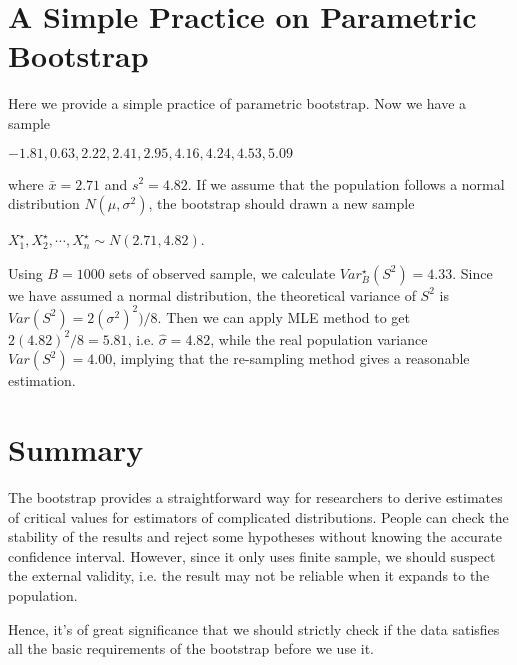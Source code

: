 \documentclass{journal}
\begin{document}
\section{A Simple Practice on Parametric Bootstrap}
\par Here we provide a simple practice of parametric bootstrap. Now we have a sample
\begin{center}
$ -1.81, 0.63, 2.22, 2.41, 2.95, 4.16, 4.24, 4.53, 5.09 $
\end{center}
where $ \bar{x}=2.71 $ and $ s^2=4.82 $. If we assume that the population follows a normal distribution $ N(\mu,\sigma^2) $, the bootstrap should drawn a new sample
\begin{center}
$ X_1^\star, X_2^\star, \cdots, X_n^\star \sim N(2.71, 4.82) $.
\end{center}
\par Using $B=1000$ sets of observed sample, we calculate $ Var_B^\star(S^2)=4.33 $. Since we have assumed a normal distribution, the theoretical variance of $ S^2 $ is $ Var(S^2)=2(\sigma^2)^2)/8 $. Then we can apply MLE method to get $ 2(4.82)^2/8=5.81 $, i.e. $ \hat{\sigma}=4.82 $, while the real population variance $ Var(S^2)=4.00 $, implying that the re-sampling method gives a reasonable estimation.

\section{Summary}
\par The bootstrap provides a straightforward way for researchers to derive estimates of critical values for estimators of complicated distributions. People can check the stability of the results and reject some hypotheses without knowing the accurate confidence interval. However, since it only uses finite sample, we should suspect the external validity, i.e. the result may not be reliable when it expands to the population.
\par  Hence, it's of great significance that we should strictly check if the data satisfies all the basic requirements of the bootstrap before we use it.
\end{document}

